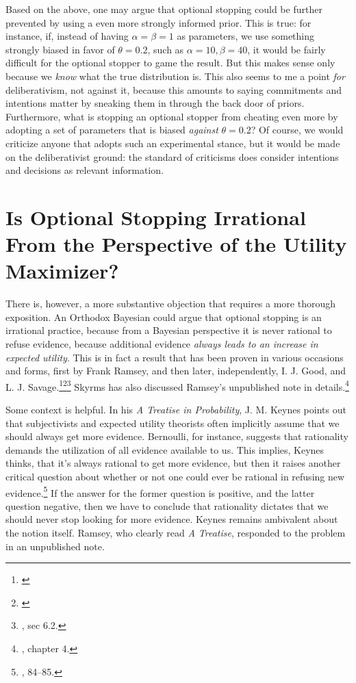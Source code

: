 Based on the above, one may argue that optional stopping could be further prevented by using a even more strongly informed prior. This is true: for instance, if, instead of
having \(\alpha = \beta = 1\) as parameters, we use something strongly
biased in favor of \(\theta = 0.2\), such as
\(\alpha = 10, \beta = 40\), it would be fairly difficult for the
optional stopper to game the result. But this makes sense only because we \emph{know} what the true distribution is. This also seems to me a point
\emph{for} deliberativism, not against it, because this amounts to
saying commitments and intentions matter by sneaking them in through the
back door of priors. Furthermore, what is stopping an optional stopper
from cheating even more by adopting a set of parameters that is biased
\emph{against} \(\theta = 0.2\)? Of course, we would criticize anyone
that adopts such an experimental stance, but it would be made on the
deliberativist ground: the standard of criticisms does consider intentions and decisions as relevant information.

\hypertarget{is-optional-stopping-irrational-from-the-perspective-of-the-utility-maximizer}{%
\section{Is Optional Stopping Irrational From the Perspective of the
Utility
Maximizer?}\label{is-optional-stopping-irrational-from-the-perspective-of-the-utility-maximizer}}

There is, however, a more substantive objection that requires a more
thorough exposition. An Orthodox Bayesian could argue that optional
stopping is an irrational practice, because from a Bayesian perspective
it is never rational to refuse evidence, because additional evidence
\emph{always leads to an increase in expected utility}. This is in fact a
result that has been proven in various occasions and forms, first by Frank
Ramsey, and then later, independently, I. J. Good, and L. J. Savage.\footnote{\cite{ramseyvalue}}\footnote{\cite{goodtotalevidence}}\footnote{\cite{savage}, sec 6.2.} Skyrms has also discussed Ramsey's unpublished note in details.\footnote{\cite{rationaldel}, chapter 4.}

Some context is helpful. In his \emph{A Treatise in Probability}, J. M.
Keynes points out that subjectivists and expected utility theorists
often implicitly assume that we should always get more evidence.
Bernoulli, for instance, suggests that rationality demands the
utilization of all evidence available to us. This implies, Keynes
thinks, that it's always rational to get more evidence, but then it
raises another critical question about whether or not one could ever be
rational in refusing new evidence.\footnote{\cite{keynes}, 84--85.} If the answer for the former question is
positive, and the latter question negative, then we have to conclude
that rationality dictates that we should never stop looking for more
evidence. Keynes remains ambivalent about the notion itself. Ramsey, who clearly read \emph{A Treatise}, responded to the problem in an
unpublished note.

